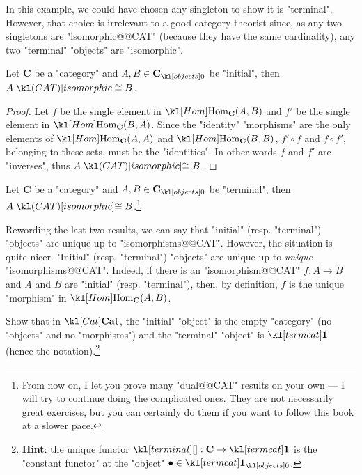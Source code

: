 \documentclass[main.tex]{subfiles}
\begin{document}
In this example, we could have chosen any singleton to show it is "terminal". However, that choice is irrelevant to a good category theorist since, as any two singletons are "isomorphic@@CAT" (because they have the same cardinality), any two "terminal" "objects" are "isomorphic".
\begin{prop}\label{prop:initialunique}
	Let $\mathbf{C}$ be a "category" and $A,B\in \obj{\mathbf{C}}$ be "initial", then $A \isoCAT B$.
\end{prop}
\begin{proof}
	Let $f$ be the single element in $\Hom_{\mathbf{C}}(A,B)$ and $f'$ be the single element in $\Hom_{\mathbf{C}}(B,A)$. Since the "identity" "morphisms" are the only elements of $\Hom_{\mathbf{C}}(A,A)$ and $\Hom_{\mathbf{C}}(B,B)$, $f' \circ f$ and $f\circ f'$, belonging to these sets, must be the "identities". In other words $f$ and $f'$ are "inverses", thus $A \isoCAT B$. 
\end{proof}
\begin{cor}\label{cor:terminalunique}
	Let $\mathbf{C}$ be a "category" and $A,B\in \obj{\mathbf{C}}$ be "terminal", then $A \isoCAT B$.\footnote{From now on, I let you prove many "dual@@CAT" results on your own --- I will try to continue doing the complicated ones. They are not necessarily great exercises, but you can certainly do them if you want to follow this book at a slower pace.}
\end{cor}
Rewording the last two results, we can say that "initial" (resp. "terminal") "objects" are unique up to "isomorphisms@@CAT". However, the situation is quite nicer. "Initial" (resp. "terminal") "objects" are unique up to  \textit{unique} "isomorphisms@@CAT". Indeed, if there is an "isomorphism@@CAT" $f: A \rightarrow B$ and $A$ and $B$ are "initial" (resp. "terminal"), then, by definition, $f$ is the unique "morphism" in $\Hom_{\mathbf{C}}(A,B)$. %
\begin{exer}\label{exer:duality:inittermcat}
	Show that in $\catCat$, the "initial" "object" is the empty "category" (no "objects" and no "morphisms") and the "terminal" "object" is $\termcat$ (hence the notation).\footnote{\textbf{Hint}: the unique functor $\termmorph:\mathbf{C} \rightarrow \termcat$ is the "constant functor" at the "object" $\bullet \in \obj{\termcat}$.}
\end{exer}
\end{document}
